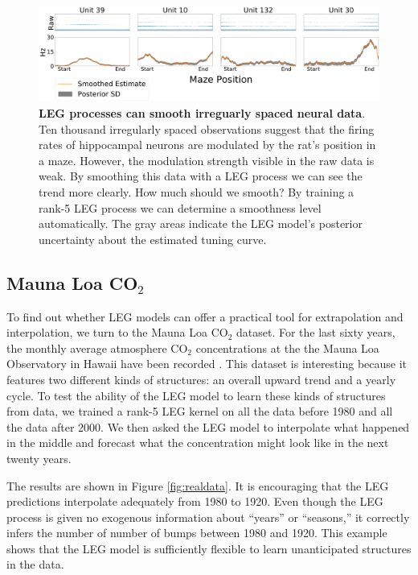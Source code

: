 \documentclass{article}
\theoremstyle{definition}
\begin{document}
\begin{figure}
\vskip 0.2in
\begin{center}
\centerline{\includegraphics[width=2\columnwidth]{pics/kenny}}
\caption{\textbf{LEG processes can smooth irreguarly spaced neural data}.  Ten thousand irregularly spaced observations suggest that the firing rates of hippocampal neurons are modulated by the rat's position in a maze.  However, the modulation strength visible in the raw data is weak.  By smoothing this data with a LEG process we can see the trend more clearly. How much should we smooth?  By training a rank-5 LEG process we can determine a smoothness level automatically. The gray areas indicate the LEG model's posterior uncertainty about the estimated tuning curve.}
\label{fig:kenny}
\end{center}
\vskip -0.2in
\end{figure}

\subsection{Mauna Loa CO$_2$}


To find out whether LEG models can offer a practical tool for extrapolation and interpolation, we turn to the Mauna Loa CO$_2$ dataset.  For the last sixty years, the monthly average atmosphere CO$_2$ concentrations at the the Mauna Loa Observatory in Hawaii have been recorded \cite{keeling2005atmospheric}.  This dataset is interesting because it features two different kinds of structures: an overall upward trend and a yearly cycle.  To test the ability of the LEG model to learn these kinds of structures from data, we trained a rank-5 LEG kernel on all the data before 1980 and all the data after 2000.  We then asked the LEG model to interpolate what happened in the middle and forecast what the concentration might look like in the next twenty years.  

The results are shown in Figure \ref{fig:realdata}.  It is encouraging that the LEG predictions interpolate adequately from 1980 to 1920.  Even though the LEG process is given no exogenous information about  ``years'' or ``seasons,'' it correctly infers the number of number of bumps between 1980 and 1920.  This example shows that the LEG model is sufficiently flexible to learn unanticipated structures in the data.  
\end{document}
